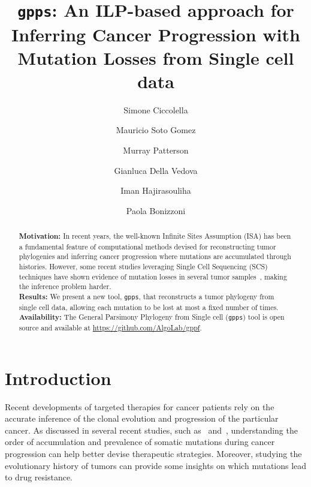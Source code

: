 \documentclass[a4paper,USenglish]{article}
\title{\texttt{gpps}: An ILP-based approach for Inferring Cancer Progression with Mutation Losses
  from Single cell data}
\author{Simone Ciccolella \and   Mauricio Soto Gomez \and
  Murray Patterson \and
  Gianluca Della Vedova \and
  Iman Hajirasouliha \and
  Paola Bonizzoni}
\theoremstyle{definition}
\begin{document}

\maketitle

\begin{abstract}
\textbf{Motivation:} In recent years, the well-known Infinite Sites Assumption (ISA) has
been a fundamental feature of computational methods devised for reconstructing tumor
phylogenies and inferring cancer progression where mutations are accumulated through
histories.
However, some recent studies leveraging Single Cell Sequencing (SCS) techniques have shown
evidence of mutation losses in several tumor samples~\cite{Kuipers13102017}, making the inference problem harder.\\
\textbf{Results:}
We present a new tool, \texttt{gpps}, that reconstructs a tumor phylogeny from single
cell data, allowing each mutation to be lost at most a fixed number of times.\\
\textbf{Availability:} The General Parsimony Phylogeny from Single cell (\texttt{gpps})
tool is open source and available at   \url{https://github.com/AlgoLab/gppf}.\\
\end{abstract}

\section{Introduction}

Recent developments of targeted therapies for cancer patients rely on the accurate inference of the clonal evolution and progression of the particular cancer. As discussed in several recent studies, such as~\cite{Morrissy2016} and~\cite{Wang2016}, understanding the order of accumulation and prevalence of somatic mutations during cancer progression can help better devise therapeutic strategies.
Moreover, studying the evolutionary history of tumors can provide some insights on which
mutations lead to drug resistance.
\end{document}
